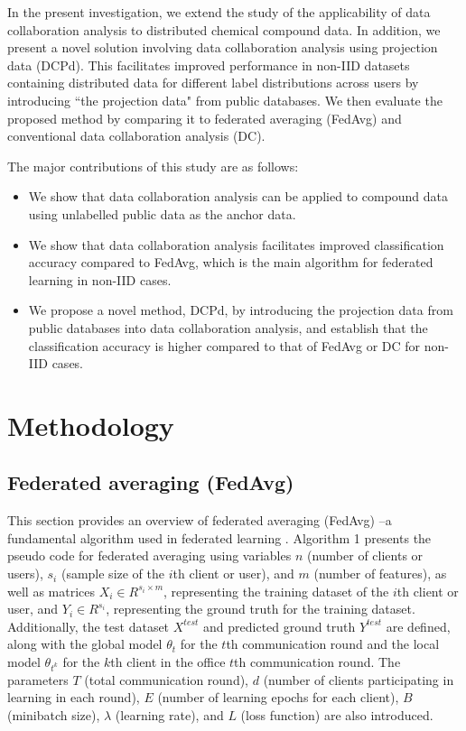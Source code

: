 \documentclass{article}
\begin{document}
In the present investigation, we extend the study of the applicability of data collaboration analysis to distributed chemical compound data. In addition, we present a novel solution involving data collaboration analysis using projection data (DCPd). This facilitates improved performance in non-IID datasets containing distributed data for different label distributions across users by introducing ``the projection data" from public databases. We then evaluate the proposed method by comparing it to federated averaging (FedAvg) and conventional data collaboration analysis (DC).

The major contributions of this study are as follows:

\begin{itemize}
      \item We show that data collaboration analysis can be applied to compound data using unlabelled public data as the anchor data.
      \item We show that data collaboration analysis facilitates improved classification accuracy compared to FedAvg, which is the main algorithm for federated learning in non-IID cases.
      \item We propose a novel method, DCPd, by introducing the projection data from public databases into data collaboration analysis, and establish that the classification accuracy is higher compared to that of FedAvg or DC for non-IID cases.
\end{itemize}



\section{Methodology}
\subsection{Federated averaging (FedAvg)}
This section provides an overview of federated averaging (FedAvg) \cite{mcmahan2017communication}--a fundamental algorithm used in federated learning \cite{konevcny2016federated}. Algorithm 1 presents the pseudo code for federated averaging using variables $n$ (number of clients or users), $s_i$ (sample size of the $i$th client or user), and $m$ (number of features), as well as matrices $X_i \in R^{s_{i} \times {m}}$, representing the training dataset of the $i$th client or user, and $Y_i \in R^{s_i}$, representing the ground truth for the training dataset. Additionally, the test dataset $X^{test}$ and predicted ground truth $Y^{test}$ are defined, along with the global model $\theta_{t}$ for the $t$th communication round and the local model $\theta_{t^k}$ for the $k$th client in the office $t$th communication round. The parameters $T$ (total communication round), $d$ (number of clients participating in learning in each round), $E$ (number of learning epochs for each client), $B$ (minibatch size), $\lambda$ (learning rate), and $L$ (loss function) are also introduced. 
\end{document}
